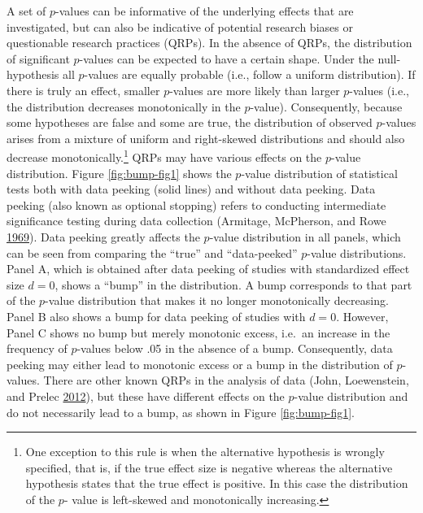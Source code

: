 \documentclass[a5paper]{book}
\let\rmarkdownfootnote\footnote%
\def\footnote{\protect\rmarkdownfootnote}
\begin{document}
A set of \(p\)-values can be informative of the underlying effects that
are investigated, but can also be indicative of potential research
biases or questionable research practices (QRPs). In the absence of
QRPs, the distribution of significant \(p\)-values can be expected to
have a certain shape. Under the null-hypothesis all \(p\)-values are
equally probable (i.e., follow a uniform distribution). If there is
truly an effect, smaller \(p\)-values are more likely than larger
\(p\)-values (i.e., the distribution decreases monotonically in the
\(p\)-value). Consequently, because some hypotheses are false and some
are true, the distribution of observed \(p\)-values arises from a
mixture of uniform and right-skewed distributions and should also
decrease monotonically.\footnote{One exception to this rule is when the
  alternative hypothesis is wrongly specified, that is, if the true
  effect size is negative whereas the alternative hypothesis states that
  the true effect is positive. In this case the distribution of the
  \(p\)- value is left-skewed and monotonically increasing.} QRPs may
have various effects on the \(p\)-value distribution. Figure
\ref{fig:bump-fig1} shows the \(p\)-value distribution of statistical
tests both with data peeking (solid lines) and without data peeking.
Data peeking (also known as optional stopping) refers to conducting
intermediate significance testing during data collection (Armitage,
McPherson, and Rowe
\protect\hyperlink{ref-doi:10.2307ux2f2343787}{1969}). Data peeking
greatly affects the \(p\)-value distribution in all panels, which can be
seen from comparing the \enquote{true} and \enquote{data-peeked}
\(p\)-value distributions. Panel A, which is obtained after data peeking
of studies with standardized effect size \(d=0\), shows a \enquote{bump}
in the distribution. A bump corresponds to that part of the \(p\)-value
distribution that makes it no longer monotonically decreasing. Panel B
also shows a bump for data peeking of studies with \(d=0\). However,
Panel C shows no bump but merely monotonic excess, i.e.~an increase in
the frequency of \(p\)-values below .05 in the absence of a bump.
Consequently, data peeking may either lead to monotonic excess or a bump
in the distribution of \(p\)-values. There are other known QRPs in the
analysis of data (John, Loewenstein, and Prelec
\protect\hyperlink{ref-doi:10.1177ux2f0956797611430953}{2012}), but
these have different effects on the \(p\)-value distribution and do not
necessarily lead to a bump, as shown in Figure \ref{fig:bump-fig1}.
\end{document}
